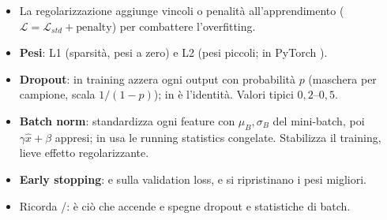 \begin{sintesi}
\begin{itemize}
  \item La regolarizzazione aggiunge vincoli o penalità all'apprendimento ($\mathcal{L} = \mathcal{L}_{std} + \text{penalty}$) per
        combattere l'overfitting.
  \item \textbf{Pesi}: L1 (sparsità, pesi a zero) e L2 (pesi piccoli; in PyTorch ).
  \item \textbf{Dropout}: in training azzera ogni output con probabilità $p$ (maschera per campione, scala $1/(1-p)$); in
         è l'identità. Valori tipici $0{,}2$--$0{,}5$.
  \item \textbf{Batch norm}: standardizza ogni feature con $\mu_B,\sigma_B$ del mini-batch, poi $\gamma\hat x+\beta$ appresi; in
         usa le running statistics congelate. Stabilizza il training, lieve effetto regolarizzante.
  \item \textbf{Early stopping}:  e  sulla validation loss, e si ripristinano i pesi migliori.
  \item Ricorda /: è ciò che accende e spegne dropout e statistiche di batch.
\end{itemize}
\end{sintesi}
